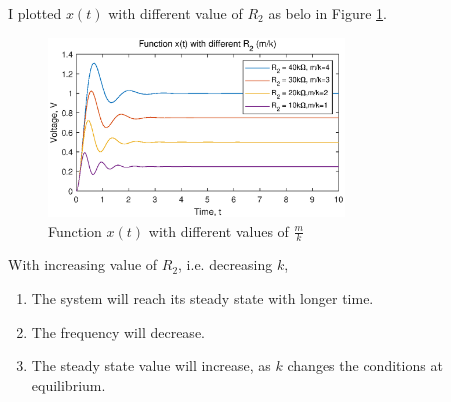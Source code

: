 I plotted $x(t)$ with different value of $R_2$ as belo in Figure \ref{pic-m-k}.

\begin{figure}
  \centering
  \includegraphics[width=0.7\textwidth]{pics/change-m-k.eps}
  \caption{Function $x(t)$ with different values of $\frac{m}{k}$}
  \label{pic-m-k}
\end{figure}

With increasing value of $R_2$, i.e. decreasing $k$,
\begin{enumerate}
  \item The system will reach its steady state with longer time.
  \item The frequency will decrease.
  \item The steady state value will increase, as $k$ changes the conditions
  at equilibrium.
\end{enumerate}

\pagebreak
{}
